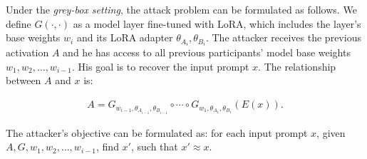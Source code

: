 Under the \emph{grey-box setting}, the attack problem can be formulated as follows. We define $G(\cdot , \cdot)$ as a model layer fine-tuned with LoRA, which includes the layer's base weights $w_i$ and its LoRA adapter $\theta_{A_i},\theta_{B_i}$. The attacker receives the previous activation $A$ and he has access to all previous participants' model base weights $w_1, w_2, \ldots, w_{i-1}$. His goal is to recover the input prompt $x$. The relationship between $A$ and $x$ is:
\begin{footnotesize}
        \begin{align}
    A= G_{w_{i-1},\theta_{A_{i-1}},\theta_{B_{i-1}}}\circ \cdots \circ G_{w_1,\theta_{A_1},\theta_{B_1}} (E(x)).
\end{align}
\end{footnotesize}


The attacker's objective can be formulated as: for each input prompt $x$, given $A, G, w_1, w_2, \ldots, w_{i-1}$, find $x'$, such that $x'\approx x$.
